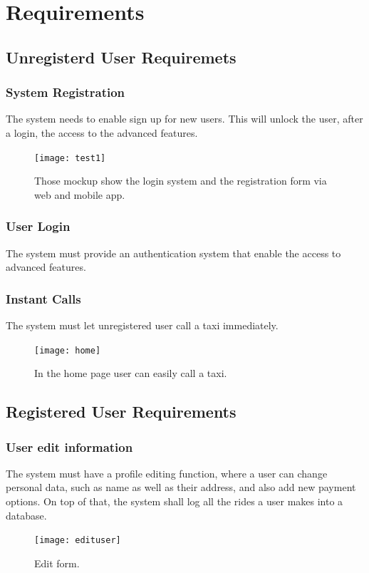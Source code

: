 \section{Requirements}
	\subsection {Unregisterd User Requiremets}
		\subsubsection {System Registration}
			The system needs to enable sign up for new users. This will unlock the user, after a login, the access to the advanced features.
			\begin{figure}[h!]
				\texttt{[image: test1]}
				\caption{Those mockup show the login system and the registration form via web and mobile app.}
			\end{figure}
			\newpage
		\subsubsection {User Login}
		 	The system must provide an authentication system that enable the access to advanced features.
		\subsubsection {Instant Calls}
			The system must let unregistered user call a taxi immediately.
			\begin{figure}[h!]
				\texttt{[image: home]}
				\caption{In the home page user can easily call a taxi.}
			\end{figure}
			\newpage
	\subsection {Registered User Requirements}
		\subsubsection {User edit information}
			The system must have a profile editing function, where a user can change personal data, such as name as well as their address,
			and also add new payment options. On top of that, the system shall log all the rides a user makes into a database.
			\begin{figure}[h!]
				\texttt{[image: edituser]}
				\caption{Edit form.}
			\end{figure}
			\newpage
